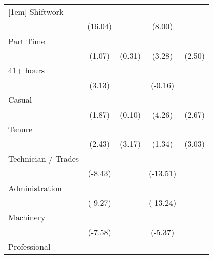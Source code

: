 {\begin{tabular}{l*{4}{c}}
[1em]
Shiftwork           &            \sym{***}&                     &            \sym{***}&                     \\
                    &     (16.04)         &                     &      (8.00)         &                     \\
[1em]
Part Time           &                     &                     &            \sym{**} &            \sym{*}  \\
                    &      (1.07)         &      (0.31)         &      (3.28)         &      (2.50)         \\
[1em]
41+ hours           &            \sym{**} &                     &                     &                     \\
                    &      (3.13)         &                     &     (-0.16)         &                     \\
[1em]
Casual              &                     &                     &            \sym{***}&            \sym{**} \\
                    &      (1.87)         &      (0.10)         &      (4.26)         &      (2.67)         \\
[1em]
Tenure              &            \sym{*}  &            \sym{**} &                     &            \sym{**} \\
                    &      (2.43)         &      (3.17)         &      (1.34)         &      (3.03)         \\
[1em]
Technician / Trades &            \sym{***}&                     &            \sym{***}&                     \\
                    &     (-8.43)         &                     &    (-13.51)         &                     \\
[1em]
Administration      &            \sym{***}&                     &            \sym{***}&                     \\
                    &     (-9.27)         &                     &    (-13.24)         &                     \\
[1em]
Machinery           &            \sym{***}&                     &            \sym{***}&                     \\
                    &     (-7.58)         &                     &     (-5.37)         &                     \\
[1em]
Professional        &            \sym{*}  &                     &            \sym{***}&                     \\

\end{tabular}}
